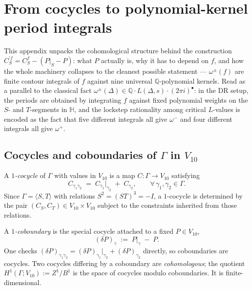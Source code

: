 \documentclass[11pt,letterpaper]{article}
\newcommand{\HH}{\mathbb{H}}
\newcommand{\QQ}{\mathbb{Q}}
\begin{document}
\appendix

\section{From cocycles to polynomial-kernel period integrals}\label{app:cohomology}

This appendix unpacks the cohomological structure behind the construction
$C^{\prime f}_S = C^f_S - (P|_S - P)$: what $P$ actually is, why it has to
depend on $f$, and how the whole machinery collapses to the cleanest
possible statement --- $\omega^\pm(f)$ are finite contour integrals of $f$
against nine universal $\QQ$-polynomial kernels.  Read as a parallel to the
classical fact $\omega^\pm(\Delta) \in \QQ\cdot L(\Delta, s)\cdot(2\pi i)^\bullet$:
in the DR setup, the periods are obtained by integrating $f$ against fixed
polynomial weights on the $S$- and $T$-segments in $\HH$, and the
lockstep rationality among critical $L$-values is encoded as the fact that
five different integrals all give $\omega^-$ and four different integrals
all give $\omega^+$.

\subsection{Cocycles and coboundaries of $\Gamma$ in $V_{10}$}\label{app:cocycles-defs}

A \emph{$1$-cocycle} of $\Gamma$ with values in $V_{10}$ is a map
$C : \Gamma \to V_{10}$ satisfying
\begin{equation}\label{eq:app-cocycle-rel}
  C_{\gamma_1\gamma_2} \;=\; C_{\gamma_1}\big|_{\gamma_2} \;+\; C_{\gamma_2},
  \qquad \forall\,\gamma_1, \gamma_2 \in \Gamma.
\end{equation}
Since $\Gamma = \langle S, T\rangle$ with relations $S^2 = (ST)^3 = -I$, a
$1$-cocycle is determined by the pair $(C_S, C_T) \in V_{10} \times V_{10}$
subject to the constraints inherited from those relations.

A \emph{$1$-coboundary} is the special cocycle attached to a fixed $P \in V_{10}$,
\begin{equation}\label{eq:app-coboundary}
  (\delta P)_\gamma \;:=\; P\big|_\gamma \;-\; P.
\end{equation}
One checks $(\delta P)_{\gamma_1\gamma_2} = (\delta P)_{\gamma_1}|_{\gamma_2}
+ (\delta P)_{\gamma_2}$ directly, so coboundaries are cocycles.  Two
cocycles differing by a coboundary are \emph{cohomologous}; the quotient
\(H^1(\Gamma; V_{10}) := Z^1/B^1\)
is the space of cocycles modulo coboundaries.  It is finite-dimensional.
\end{document}
